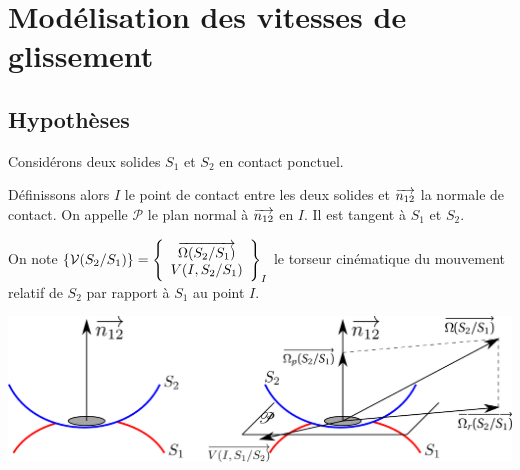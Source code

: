 \documentclass[11pt,oneside]{article}
\begin{document}


\section{Modélisation des vitesses de glissement}
\subsection{Hypothèses}
Considérons deux solides $S_1$ et $S_2$ en contact ponctuel. 

Définissons alors $I$ le point de contact entre les deux solides et $\overrightarrow{n_{12}}$ la normale de contact. On appelle $\mathcal{P}$ le plan normal à $\overrightarrow{n_{12}}$ en $I$. Il est tangent à $S_1$ et $S_2$. 

On note $
\{\mathcal{V}(S_2/S_1)\}
=\left\{
\begin{array}{c}
\overrightarrow{\Omega(S_2/S_1)}\\
V(I,S_2/S_1)
\end{array}
\right\}_I$
le torseur cinématique du mouvement relatif de $S_2$ par rapport à $S_1$ au point $I$.


\begin{center}
\includegraphics[width=.8\textwidth]{png/ContactReel} 
\end{center}
\end{document}
